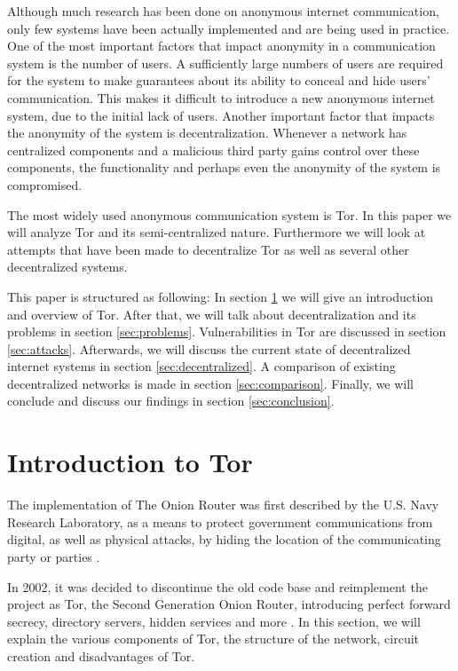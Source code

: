 \documentclass{article}
\begin{document}
	Although much research has been done on anonymous internet communication, only few systems have been actually implemented and are being used in practice. One of the most important factors that impact anonymity in a communication system is the number of users. A sufficiently large numbers of users are required for the system to make guarantees about its ability to conceal and hide users' communication. This makes it difficult to introduce a new anonymous internet system, due to the initial lack of users. Another important factor that impacts the anonymity of the system is decentralization. Whenever a network has centralized components and a malicious third party gains control over these components, the functionality and perhaps even the anonymity of the system is compromised.
	
	The most widely used anonymous communication system is Tor. In this paper we will analyze Tor and its semi-centralized nature. Furthermore we will look at attempts that have been made to decentralize Tor as well as several other decentralized systems.
	
	This paper is structured as following: In section \ref{sec:tor} we will give an introduction and overview of Tor. After that, we will talk about decentralization and its problems in section \ref{sec:problems}. Vulnerabilities in Tor are discussed in section \ref{sec:attacks}. Afterwards, we will discuss the current state of decentralized internet systems in section \ref{sec:decentralized}. A comparison of existing decentralized networks is made in section \ref{sec:comparison}. Finally, we will conclude and discuss our findings in section \ref{sec:conclusion}.
	
\section{Introduction to Tor}
	\label{sec:tor}
	
	The implementation of The Onion Router was first described by the U.S. Navy Research Laboratory, as a means to protect government communications from digital, as well as physical attacks, by hiding the location of the communicating party or parties \cite{goldschlag1996hiding}.
	
	In 2002, it was decided to discontinue the old code base and reimplement the project as Tor, the Second Generation Onion Router, introducing perfect forward secrecy, directory servers, hidden services and more \cite{dingledine2004tor}. In this section, we will explain the various components of Tor, the structure of the network, circuit creation and disadvantages of Tor.
	
\end{document}
